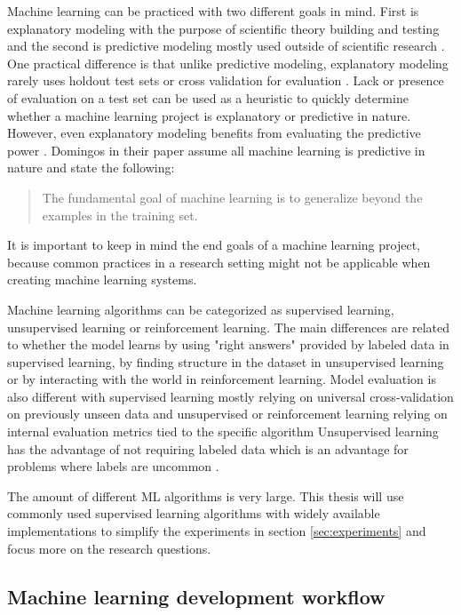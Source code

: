 Machine learning can be practiced with two different goals in mind. First is explanatory modeling with the purpose of scientific theory building and testing and the second is predictive modeling mostly used outside of scientific research \parencite{shmueliExplainPredict2010a}.
One practical difference is that unlike predictive modeling, explanatory modeling rarely uses holdout test sets or cross validation for evaluation \parencite{shmueliExplainPredict2010a}.
Lack or presence of evaluation on a test set can be used as a heuristic to quickly determine whether a machine learning project is explanatory or predictive in nature.
However, even explanatory modeling benefits from evaluating the predictive power \parencite{shmueliExplainPredict2010a}.
Domingos \parencite*{domingosFewUsefulThings2012} in their paper assume all machine learning is predictive in nature and state the following:
\begin{quote}
    The fundamental goal of machine learning is to generalize beyond the examples in the training set.
\end{quote}
It is important to keep in mind the end goals of a machine learning project, because common practices in a research setting might not be applicable when creating machine learning systems.

Machine learning algorithms can be categorized as supervised learning, unsupervised learning or reinforcement learning. %
The main differences are related to whether the model learns by using "right answers" provided by labeled data in supervised learning, by finding structure in the dataset in unsupervised learning or by interacting with the world in reinforcement learning. %
Model evaluation is also different with supervised learning mostly relying on universal cross-validation on previously unseen data and unsupervised or reinforcement learning relying on internal evaluation metrics tied to the specific algorithm %
Unsupervised learning has the advantage of not requiring labeled data which is an advantage for problems where labels are uncommon \parencite{leBuildingHighlevelFeatures2012}.

The amount of different ML algorithms is very large. This thesis will use commonly used supervised learning algorithms with widely available implementations to simplify the experiments in section \ref{sec:experiments} and focus more on the research questions.

\subsection{Machine learning development workflow}
\label{sec:mlworkflow}

